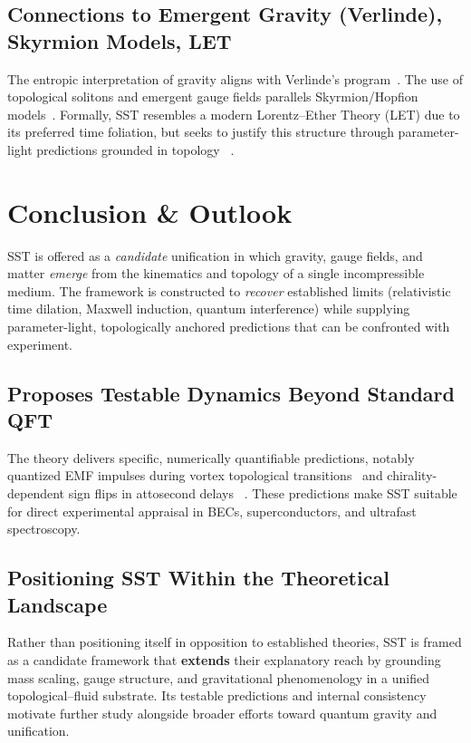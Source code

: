 \documentclass[10pt,reprint,aps,onecolumn,nofootinbib]{revtex4-2}
\begin{document}
    \subsection*{Connections to Emergent Gravity (Verlinde), Skyrmion Models, LET}
        The entropic interpretation of gravity aligns with Verlinde’s program~\cite{chiralSwirl, Verlinde2011,Verlinde2017,Jacobson1995}. The use of topological solitons and emergent gauge fields parallels Skyrmion/Hopfion models~\cite{sstLagrangian,Skyrme1962,MantonSutcliffe2004}. Formally, SST resembles a modern Lorentz–Ether Theory (LET) due to its preferred time foliation, but seeks to justify this structure through parameter-light predictions grounded in topology~ \cite{sstLagrangian}.

\section{Conclusion \& Outlook}\label{sec:conclusion}
SST is offered as a \emph{candidate} unification in which gravity, gauge fields, and matter \emph{emerge} from the kinematics and topology of a single incompressible medium. The framework is constructed to \emph{recover} established limits (relativistic time dilation, Maxwell induction, quantum interference) while supplying parameter-light, topologically anchored predictions that can be confronted with experiment.

    \subsection*{Proposes Testable Dynamics Beyond Standard QFT}
        The theory delivers specific, numerically quantifiable predictions, notably quantized EMF impulses during vortex topological transitions~ \cite{EM_G} and chirality-dependent sign flips in attosecond delays~ \cite{sstAttosecondPhotoionization}. These predictions make SST suitable for direct experimental appraisal in BECs, superconductors, and ultrafast spectroscopy.

    \subsection*{Positioning SST Within the Theoretical Landscape}
        Rather than positioning itself in opposition to established theories, SST is framed as a candidate framework that \textbf{extends} their explanatory reach by grounding mass scaling, gauge structure, and gravitational phenomenology in a unified topological–fluid substrate. Its testable predictions and internal consistency motivate further study alongside broader efforts toward quantum gravity and unification.
\end{document}
